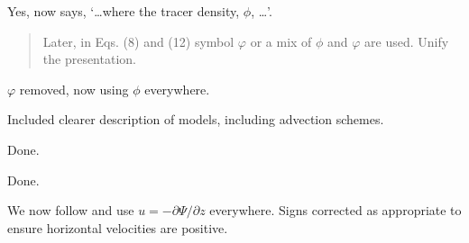 \documentclass{article}
\begin{document}
\begin{quotation}
\begin{comment}
\item Eq. (7): The tracer symbol $\phi$ is undefined from a physical viewpoints.  Do you imply the tracer density?
\end{comment}
\end{quotation}
Yes, now says, `\ldots where the tracer density, $\phi$, \ldots'.

\begin{quotation}
Later, in Eqs. (8) and (12) symbol $\varphi$ or a mix of $\phi$ and $\varphi$ are used.  Unify the presentation.
\end{quotation}
$\varphi$ removed, now using $\phi$ everywhere.

\begin{quotation}
\begin{comment}
\item Section 3: Add information about the different numerical options that are assessed in combination with the orography treatment.
\end{comment}
\end{quotation}
Included clearer description of models, including advection schemes.

\begin{quotation}
\begin{comment}
\item Line 189: the term 2a needs be in parenthesis
\end{comment}
\end{quotation}
Done.

\begin{quotation}
\begin{comment}
\item Line 194: be more precise: `\ldots constant wind above $z_2$ \ldots'
\end{comment}
\end{quotation}
Done.

\begin{quotation}
\begin{comment}
\item Line 198 and Eq. (16): Two different sign conventions for the stream function are used with flipped signs that either lead to a negative (line 198) or positive (Eq. (16)) sign in the definition of the zonal velocity $u$.  Unify the presentation.
\end{comment}
\end{quotation}
We now follow \citet{schaer2002} and use $u=-\partial \Psi/\partial z$ everywhere.  Signs corrected as appropriate to ensure horizontal velocities are positive.
\end{document}
